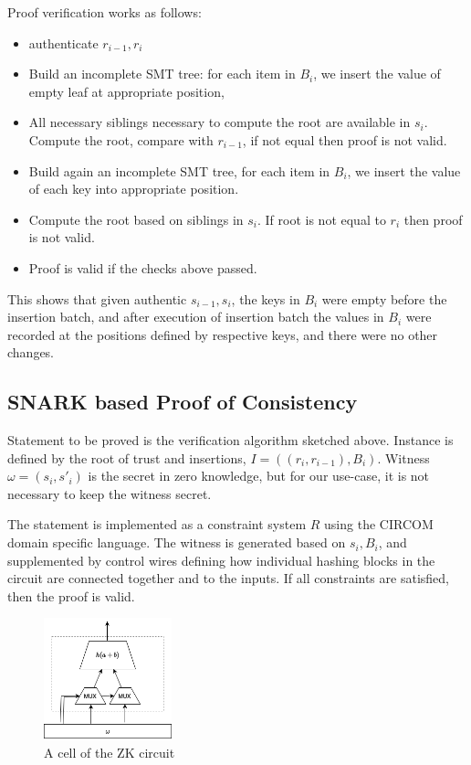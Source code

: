 Proof verification works as follows:
\begin{itemize}
    \item authenticate $r_{i-1}, r_i$
    \item Build an incomplete SMT tree: for each item in $B_i$, we insert the value of empty leaf at appropriate position,
    \item All necessary siblings necessary to compute the root are available in $s_i$. Compute the root, compare with $r_{i-1}$, if not equal then proof is not valid.
    \item Build again an incomplete SMT tree, for each item in $B_i$, we insert the value of each key into appropriate position.
    \item Compute the root based on siblings in $s_i$. If root is not equal to $r_i$ then proof is not valid.
    \item Proof is valid if the checks above passed.
\end{itemize}

This shows that given authentic $s_{i-1}, s_i$, the keys in $B_i$ were empty before the insertion batch, and after execution of insertion batch the values in $B_i$ were recorded at the positions defined by respective keys, and there were no other changes.


\subsection{SNARK based Proof of Consistency}

Statement to be proved is the verification algorithm sketched above. Instance is defined by the root of trust and insertions, $I = ((r_i, r_{i-1}),B_i)$. Witness $\omega = (s_i, s'_i)$ is the secret in zero knowledge, but for our use-case, it is not necessary to keep the witness secret.

The statement is implemented as a constraint system $R$ using the CIRCOM domain specific language. The witness is generated based on $s_i, B_i$, and supplemented by control wires defining how individual hashing blocks in the circuit are connected together and to the inputs. If all constraints are satisfied, then the proof is valid.

\begin{figure}[htb]
    \centering
    \includegraphics[width=0.33\textwidth]{smt-circuit-cell.drawio}
    \caption{A cell of the ZK circuit}
    \label{fig:zk-circuit-cell}
\end{figure}


